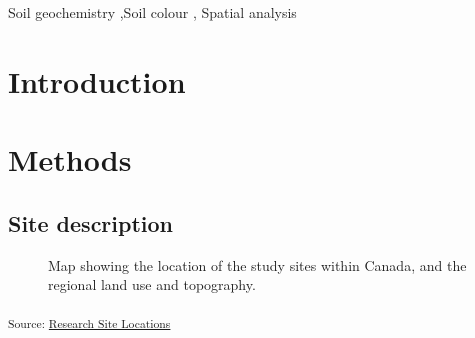 \documentclass[
  number]{elsarticle}
\begin{document}
\begin{frontmatter}
\begin{keyword}
    Soil geochemistry \sep Soil colour \sep 
    Spatial analysis
\end{keyword}
\end{frontmatter}
    
\section{Introduction}\label{introduction}

\section{Methods}\label{methods}

\subsection{Site description}\label{site-description}

\begin{figure}[H]


\caption{\label{fig-location_map}Map showing the location of the study
sites within Canada, and the regional land use and topography.}

\end{figure}%

\textsubscript{Source:
\href{https://alex-koiter.github.io/spatial-variability-soil-manuscript/notebooks/location_map.qmd.html\#cell-fig-location_map}{Research
Site Locations}}
\end{document}
